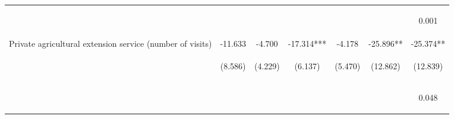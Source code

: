 \begin{center}
\begin{tabular}{lcccccc}
\vspace{4pt} & \begin{footnotesize}[0.413]\end{footnotesize} & \begin{footnotesize}[0.069]\end{footnotesize} & \begin{footnotesize}[0.089]\end{footnotesize} & \begin{footnotesize}[0.466]\end{footnotesize} & \begin{footnotesize}[0.000]\end{footnotesize} & \begin{footnotesize}0.001\end{footnotesize} \\
Private agricultural extension service (number of visits) & -11.633 & -4.700 & -17.314*** & -4.178 & -25.896** & -25.374** \\
 & \begin{footnotesize}(8.586)\end{footnotesize} & \begin{footnotesize}(4.229)\end{footnotesize} & \begin{footnotesize}(6.137)\end{footnotesize} & \begin{footnotesize}(5.470)\end{footnotesize} & \begin{footnotesize}(12.862)\end{footnotesize} & \begin{footnotesize}(12.839)\end{footnotesize} \\
\vspace{4pt} & \begin{footnotesize}[0.175]\end{footnotesize} & \begin{footnotesize}[0.266]\end{footnotesize} & \begin{footnotesize}[0.005]\end{footnotesize} & \begin{footnotesize}[0.445]\end{footnotesize} & \begin{footnotesize}[0.044]\end{footnotesize} & \begin{footnotesize}0.048\end{footnotesize} \\

\end{tabular}
\end{center}
